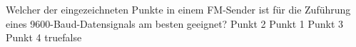     {Welcher der eingezeichneten Punkte in einem FM-Sender ist für die Zuführung eines 9600-Baud-Datensignals am besten geeignet?}
    {Punkt 2}
    {Punkt 1}
    {Punkt 3}
    {Punkt 4}
    {true}{false}